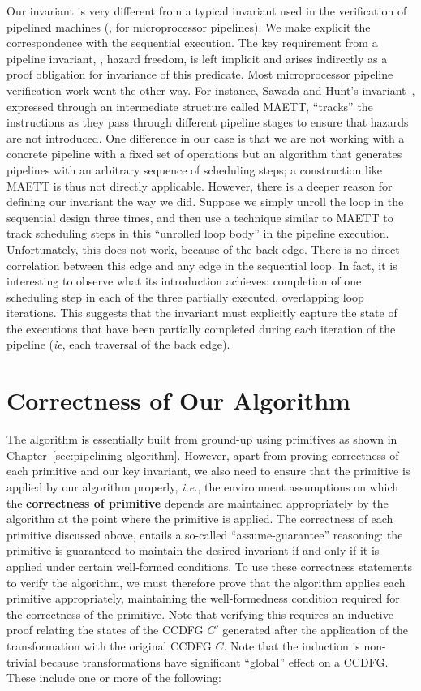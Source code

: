 Our invariant is very different from a typical invariant
used in the verification of pipelined machines (\eg, for
microprocessor pipelines).  We make explicit the
correspondence with the sequential execution.  The key
requirement from a pipeline invariant, \viz, hazard freedom,
is left implicit and arises indirectly as a proof obligation
for invariance of this predicate.  Most microprocessor
pipeline verification work went the other way.  For
instance, Sawada and Hunt's invariant~\cite{sh:pipeline},
expressed through an intermediate structure called MAETT,
``tracks'' the instructions as they pass through different
pipeline stages to ensure that hazards are not introduced.
One difference in our case is that we are not working with a
concrete pipeline with a fixed set of operations but an
algorithm that generates pipelines with an arbitrary
sequence of scheduling steps; a construction like MAETT is
thus not directly applicable.  However, there is a deeper
reason for defining our invariant the way we did.
Suppose we simply unroll the loop in the sequential
design three times, and then use a technique similar to
MAETT to track scheduling steps in this ``unrolled loop
body'' in the pipeline execution.  Unfortunately, this does
not work, because of the back edge.  There is no direct
correlation between this edge and any edge in the sequential
loop.  In fact, it is interesting to observe what its
introduction achieves: completion of one scheduling step in
each of the three partially executed, overlapping loop
iterations.  This suggests that the invariant must
explicitly capture the state of the executions that have
been partially completed during each iteration of the
pipeline ({\em ie}, each traversal of the back edge).

\section{Correctness of Our Algorithm}

The algorithm is essentially built from ground-up using primitives
as shown in Chapter~\ref{sec:pipelining-algorithm}. However, 
apart from proving correctness of each primitive and our key 
invariant, we also need to ensure that the primitive is applied by 
our algorithm properly, {\em i.e.}, the environment
assumptions on which the {\bf correctness of primitive}
depends are maintained appropriately by the algorithm at
the point where the primitive is applied. 
The correctness of each primitive discussed above, entails a
so-called ``assume-guarantee'' reasoning: the primitive is
guaranteed to maintain the desired invariant if and only if
it is applied under certain well-formed conditions.  To use
these correctness statements to verify the algorithm, we
must therefore prove that the algorithm applies each
primitive appropriately, maintaining the well-formedness
condition required for the correctness of the primitive.
Note that verifying this requires an inductive proof
relating the states of the CCDFG $C'$ generated after the
application of the transformation with the original CCDFG
$C$. Note that the induction is non-trivial because
transformations have significant ``global'' effect on a
CCDFG. These include one or more of the following:

